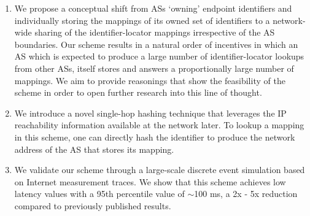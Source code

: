 \begin{enumerate}

\item
We propose a conceptual shift from ASs `owning' endpoint identifiers and individually storing the mappings of its owned set of identifiers to a network-wide sharing of the identifier-locator mappings irrespective of the AS boundaries. Our scheme results in a natural order of incentives in which an AS which is expected to produce a large number of identifier-locator lookups from other ASs, itself stores and answers a proportionally large number of mappings. We aim to provide reasonings that show the feasibility of the scheme in order to open further research into this line of thought.

\item
We introduce a novel single-hop hashing technique that leverages the IP reachability information available at the network later. To lookup a mapping in this scheme, one can directly hash the identifier to produce the network address of the AS that stores its mapping.

\item
We validate our scheme through a large-scale discrete event simulation based on Internet measurement traces. We show that this scheme achieves low latency values with a 95th percentile value of $\sim$100 ms, a 2x - 5x reduction compared to previously published results.

\end{enumerate}




